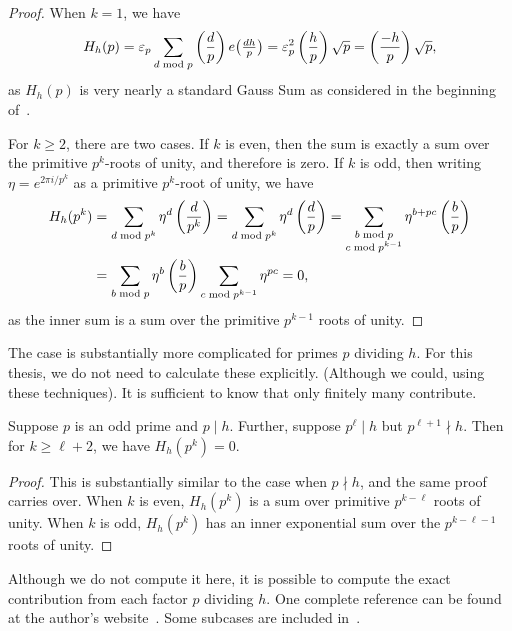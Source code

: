 \begin{proof}
  When $k = 1$, we have
  \begin{equation}
    H_h(p) = \varepsilon_p \sum_{d \bmod p} \left(\frac{d}{p}\right) e \big( \tfrac{dh}{p} \big) =
    \varepsilon_p^2 \left(\frac{h}{p}\right) \sqrt p = \left(\frac{-h}{p}\right) \sqrt p,
  \end{equation}
  as $H_h(p)$ is very nearly a standard Gauss Sum as considered in the beginning
  of~\cite{Davenport1980}.

  For $k \geq 2$, there are two cases.
  If $k$ is even, then the sum is exactly a sum over the primitive $p^k$-roots of unity,
  and therefore is zero.
  If $k$ is odd, then writing $\eta = e^{2\pi i / p^k}$ as a primitive $p^k$-root of
  unity, we have
  \begin{align}
    H_h(p^k) &= \sum_{d\bmod p^k} \eta^d \left(\frac{d}{p^k}\right) = \sum_{d\bmod p^k} \eta^d \left(\frac{d}{p}\right) =
    \sum_{\substack{b \bmod p \\ c \bmod p^{k-1}}} \eta^{b+pc} \left(\frac{b}{p}\right) \\
    &= \sum_{b\bmod p} \eta^b
    \left(\frac{b}{p}\right) \sum_{c\bmod p^{k-1}} \eta^{pc} = 0,
  \end{align}
  as the inner sum is a sum over the primitive $p^{k-1}$ roots of unity.
\end{proof}


The case is substantially more complicated for primes $p$ dividing $h$.
For this thesis, we do not need to calculate these explicitly.
(Although we could, using these techniques).
It is sufficient to know that only finitely many contribute.


\begin{lemma}\label{lem:back:Hh_badp_eval}
  Suppose $p$ is an odd prime and $p \mid h$.
  Further, suppose $p^\ell \mid h$ but $p^{\ell + 1} \nmid h$.
  Then for $k \geq \ell + 2$, we have $H_h(p^k) = 0$.
\end{lemma}


\begin{proof}

  This is substantially similar to the case when $p \nmid h$, and the same proof carries
  over.
  When $k$ is even, $H_h(p^k)$ is a sum over primitive $p^{k-\ell}$ roots of unity.
  When $k$ is odd, $H_h(p^k)$ has an inner exponential sum over the $p^{k - \ell - 1}$
  roots of unity.
%
\end{proof}


\begin{remark}
  Although we do not compute it here, it is possible to compute the exact contribution
  from each factor $p$ dividing $h$.
  One complete reference can be found at the author's website~\cite{mixedmathGauss}.
  Some subcases are included in~\cite{goldfeld1985eisenstein}.
\end{remark}


